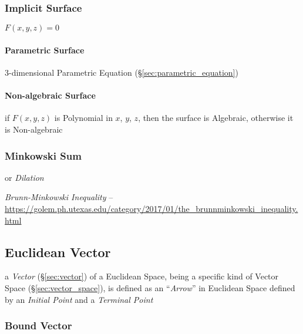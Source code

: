 \subsubsection{Implicit Surface}\label{sec:implicit_surface}

$F(x,y,z) = 0$



\paragraph{Parametric Surface}\label{sec:parametric_surface}\hfill

3-dimensional Parametric Equation (\S\ref{sec:parametric_equation})



\paragraph{Non-algebraic Surface}\label{sec:nonalgebraic_surface}\hfill

if $F(x,y,z)$ is Polynomial in $x$, $y$, $z$, then the surface is
Algebraic, otherwise it is Non-algebraic



\subsubsection{Minkowski Sum}\label{sec:minkowski_sum}

or \emph{Dilation}

\emph{Brunn-Minkowski Inequality} --
\url{https://golem.ph.utexas.edu/category/2017/01/the_brunnminkowski_inequality.html}



\subsection{Euclidean Vector}\label{sec:euclidean_vector}

a \emph{Vector} (\S\ref{sec:vector}) of a Euclidean Space, being a specific
kind of Vector Space (\S\ref{sec:vector_space}), is defined as an
``\emph{Arrow}'' in Euclidean Space defined by an \emph{Initial Point} and a
\emph{Terminal Point}



\subsubsection{Bound Vector}\label{sec:bound_vector}

